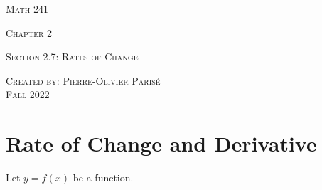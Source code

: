 \documentclass[12pt,a4paper]{article}
\begin{document}
\thispagestyle{empty}

\begin{center}
\vspace*{2.5cm}

{\Huge \textsc{Math 241}}

\vspace*{2cm}

{\LARGE \textsc{Chapter 2}} 

\vspace*{0.75cm}

\noindent\textsc{Section 2.7: Rates of Change}

\vspace*{0.75cm}

\tableofcontents

\vfill

\noindent \textsc{Created by: Pierre-Olivier Paris{\'e}} \\
\textsc{Fall 2022}
\end{center}

\newpage

\section{Rate of Change and Derivative}
Let $y = f(x)$ be a function.
\end{document}
